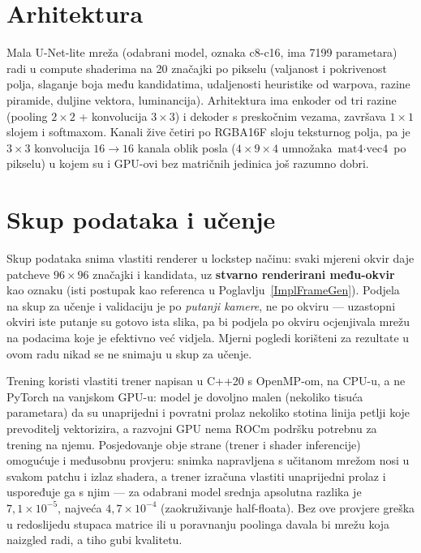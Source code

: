 \documentclass{mathos}
\begin{document}
\section{Arhitektura}

Mala U-Net-lite mreža (odabrani model, oznaka c8-c16, ima 7199 parametara)
radi u compute shaderima na 20 značajki po pikselu (valjanost i pokrivenost
polja, slaganje boja među kandidatima, udaljenosti heuristike od warpova,
razine piramide, duljine vektora, luminancija). Arhitektura ima enkoder od
tri razine (pooling $2\times2$ + konvolucija $3\times3$) i dekoder s
preskočnim vezama, završava $1\times1$ slojem i softmaxom. Kanali žive četiri
po RGBA16F sloju teksturnog polja, pa je $3\times3$ konvolucija $16\to16$
kanala oblik posla ($4\times9\times4$ umnožaka $\text{mat4}\cdot\text{vec4}$
po pikselu) u kojem su i GPU-ovi bez matričnih jedinica još razumno dobri.

\section{Skup podataka i učenje}

Skup podataka snima vlastiti renderer u lockstep načinu: svaki mjereni okvir
daje patcheve $96\times96$ značajki i kandidata, uz \textbf{stvarno
renderirani među-okvir} kao oznaku (isti postupak kao referenca u
Poglavlju~\ref{ImplFrameGen}). Podjela na skup za učenje i validaciju je po
\emph{putanji kamere}, ne po okviru — uzastopni okviri iste putanje su
gotovo ista slika, pa bi podjela po okviru ocjenjivala mrežu na podacima
koje je efektivno već vidjela. Mjerni pogledi korišteni za rezultate u
ovom radu nikad se ne snimaju u skup za učenje.

Trening koristi vlastiti trener napisan u C++20 s OpenMP-om, na CPU-u, a ne
PyTorch na vanjskom GPU-u: model je dovoljno malen (nekoliko tisuća
parametara) da su unaprijedni i povratni prolaz nekoliko stotina linija
petlji koje prevoditelj vektorizira, a razvojni GPU nema ROCm podršku
potrebnu za trening na njemu. Posjedovanje obje strane (trener i shader
inferencije) omogućuje i međusobnu provjeru: snimka napravljena s
učitanom mrežom nosi u svakom patchu i izlaz shadera, a trener izračuna
vlastiti unaprijedni prolaz i uspoređuje ga s njim — za odabrani model
srednja apsolutna razlika je $7,1\times10^{-5}$, najveća $4,7\times10^{-4}$
(zaokruživanje half-floata). Bez ove provjere greška u redoslijedu stupaca
matrice ili u poravnanju poolinga davala bi mrežu koja naizgled radi, a
tiho gubi kvalitetu.
\end{document}
